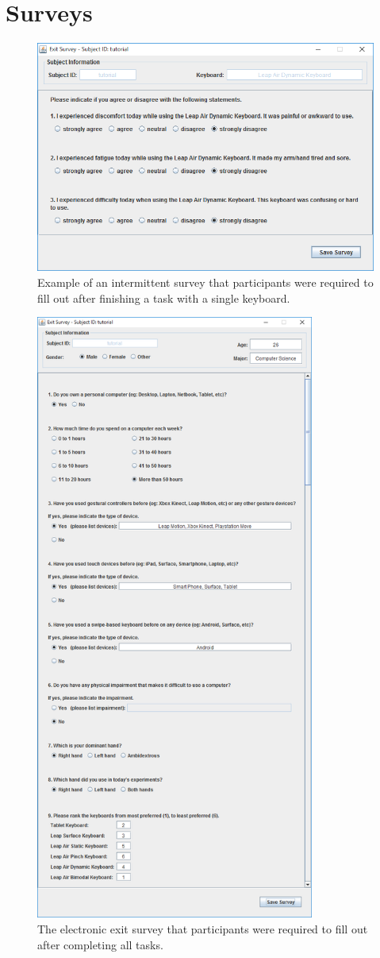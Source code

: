 \chapter{Surveys}

\begin{figure}[h]
	\centering
	\includegraphics[width=5in]{fig_survey}
	\caption[Intermittent Survey]{Example of an intermittent survey that participants were required to fill out after finishing a task with a single keyboard.}
	\label{fig_survey}
\end{figure}

\begin{figure}[h]
	\centering
	\includegraphics[width=3.6in]{fig_exit_survey}
	\caption[Exit Survey]{The electronic exit survey that participants were required to fill out after completing all tasks.}
	\label{fig_exit_survey}
\end{figure}
